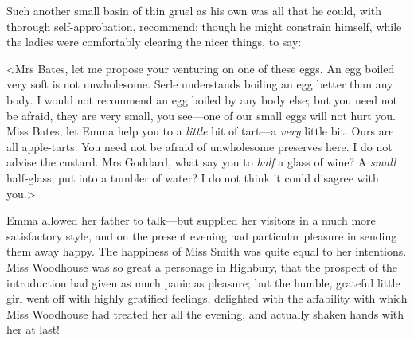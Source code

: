 Such another small basin of thin gruel as his own was all that he could, with thorough self-approbation, recommend; though he might constrain himself, while the ladies were comfortably clearing the nicer things, to say:

<Mrs Bates, let me propose your venturing on one of these eggs. An egg boiled very soft is not unwholesome. Serle understands boiling an egg better than any body. I would not recommend an egg boiled by any body else; but you need not be afraid, they are very small, you see—one of our small eggs will not hurt you. Miss Bates, let Emma help you to a \textit{little} bit of tart—a \textit{very} little bit. Ours are all apple-tarts. You need not be afraid of unwholesome preserves here. I do not advise the custard. Mrs Goddard, what say you to \textit{half} a glass of wine? A \textit{small} half-glass, put into a tumbler of water? I do not think it could disagree with you.>

Emma allowed her father to talk—but supplied her visitors in a much more satisfactory style, and on the present evening had particular pleasure in sending them away happy. The happiness of Miss Smith was quite equal to her intentions. Miss Woodhouse was so great a personage in Highbury, that the prospect of the introduction had given as much panic as pleasure; but the humble, grateful little girl went off with highly gratified feelings, delighted with the affability with which Miss Woodhouse had treated her all the evening, and actually shaken hands with her at last!